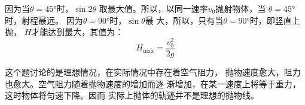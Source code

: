 因为当$\theta=\ang{45;;}$时，$\sin2\theta$
取最大值。所以，以同一速率$v_0$抛射物体，当
$\theta=\ang{45;;}$时，射程最远。
因为$\theta=\ang{90;;}$时，$\sin\theta$最
大，所以，只有当$\theta=\ang{90;;}$时，即竖直上抛，
$H$才能达到最大，其值为：
\begin{equation*}
    H_{\max }=\frac{v_{0}^{2}}{2 g}
\end{equation*}

这个题讨论的是理想情况，在实际情况中存在着空气阻力，
抛物速度愈大，阻力也愈大。空气阻力随着抛物速度的增加而逐
渐增加，在某一速度上将等于重力，这时物体将匀速下降。因而
实际上抛体的轨迹并不是理想的抛物线。
